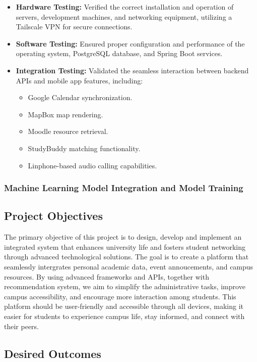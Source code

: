 \documentclass{article}
\begin{document}
\begin{itemize}
    \item \textbf{Hardware Testing:} Verified the correct installation and operation of servers, development machines, and networking equipment, utilizing a Tailscale VPN for secure connections.
    \item \textbf{Software Testing:} Ensured proper configuration and performance of the operating system, PostgreSQL database, and Spring Boot services.
    \item \textbf{Integration Testing:} Validated the seamless interaction between backend APIs and mobile app features, including:
    \begin{itemize}
        \item Google Calendar synchronization.
        \item MapBox map rendering.
        \item Moodle resource retrieval.
        \item StudyBuddy matching functionality.
        \item Linphone-based audio calling capabilities.
    \end{itemize}
\end{itemize}
\subsubsection{Machine Learning Model Integration and Model Training}

\subsection{Project Objectives}
The primary objective of this project is to design, develop and implement an integrated system that enhances
university life and fosters student networking through advanced technological solutions.
The goal is to create a platform that seamlessly intergrates personal academic data, event annoucements, and campus resources.
By using advanced frameworks and APIs, together with recommendation system, we aim to simplify the administrative tasks, improve campus accessibility, 
and encourage more interaction among students.
This platform should be user-friendly and accessible through all devices, making it easier for students to experience campus life, 
stay informed, and connect with their peers. 

\subsection{Desired Outcomes}
\end{document}
